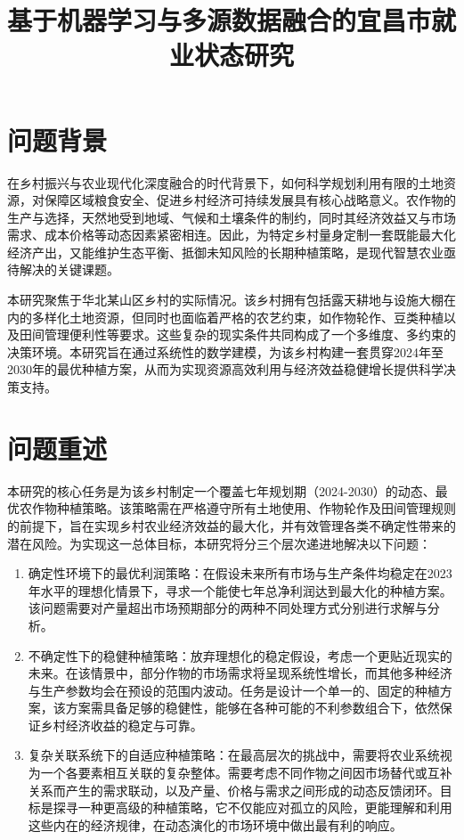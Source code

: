 \documentclass[withoutpreface,bwprint]{cumcmthesis} %
\title{基于机器学习与多源数据融合的宜昌市就业状态研究}
\begin{document}
\maketitle
\begin{abstract}

\end{abstract}





\section{问题背景}

在乡村振兴与农业现代化深度融合的时代背景下，如何科学规划利用有限的土地资源，对保障区域粮食安全、促进乡村经济可持续发展具有核心战略意义。农作物的生产与选择，天然地受到地域、气候和土壤条件的制约，同时其经济效益又与市场需求、成本价格等动态因素紧密相连。因此，为特定乡村量身定制一套既能最大化经济产出，又能维护生态平衡、抵御未知风险的长期种植策略，是现代智慧农业亟待解决的关键课题。

本研究聚焦于华北某山区乡村的实际情况。该乡村拥有包括露天耕地与设施大棚在内的多样化土地资源，但同时也面临着严格的农艺约束，如作物轮作、豆类种植以及田间管理便利性等要求。这些复杂的现实条件共同构成了一个多维度、多约束的决策环境。本研究旨在通过系统性的数学建模，为该乡村构建一套贯穿2024年至2030年的最优种植方案，从而为实现资源高效利用与经济效益稳健增长提供科学决策支持。

\section{问题重述}

本研究的核心任务是为该乡村制定一个覆盖七年规划期（2024-2030）的动态、最优农作物种植策略。该策略需在严格遵守所有土地使用、作物轮作及田间管理规则的前提下，旨在实现乡村农业经济效益的最大化，并有效管理各类不确定性带来的潜在风险。为实现这一总体目标，本研究将分三个层次递进地解决以下问题：


\begin{enumerate}
    \item 确定性环境下的最优利润策略：在假设未来所有市场与生产条件均稳定在2023年水平的理想化情景下，寻求一个能使七年总净利润达到最大化的种植方案。该问题需要对产量超出市场预期部分的两种不同处理方式分别进行求解与分析。
    \item 不确定性下的稳健种植策略：放弃理想化的稳定假设，考虑一个更贴近现实的未来。在该情景中，部分作物的市场需求将呈现系统性增长，而其他多种经济与生产参数均会在预设的范围内波动。任务是设计一个单一的、固定的种植方案，该方案需具备足够的稳健性，能够在各种可能的不利参数组合下，依然保证乡村经济收益的稳定与可靠。
    \item 复杂关联系统下的自适应种植策略：在最高层次的挑战中，需要将农业系统视为一个各要素相互关联的复杂整体。需要考虑不同作物之间因市场替代或互补关系而产生的需求联动，以及产量、价格与需求之间形成的动态反馈闭环。目标是探寻一种更高级的种植策略，它不仅能应对孤立的风险，更能理解和利用这些内在的经济规律，在动态演化的市场环境中做出最有利的响应。
\end{enumerate}
\end{document}
